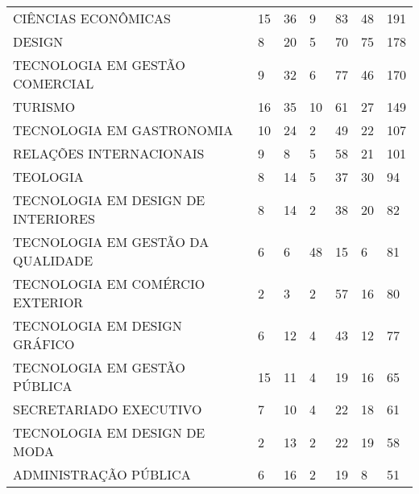 \begin{table}[H]
{\begin{tabular}{@{}lllllll@{}}
CIÊNCIAS ECONÔMICAS                      & 15                    & 36                & 9              & 83               & 48           & 191            \\
DESIGN                                   & 8                     & 20                & 5              & 70               & 75           & 178            \\
TECNOLOGIA EM GESTÃO COMERCIAL           & 9                     & 32                & 6              & 77               & 46           & 170            \\
TURISMO                                  & 16                    & 35                & 10             & 61               & 27           & 149            \\
TECNOLOGIA EM GASTRONOMIA                & 10                    & 24                & 2              & 49               & 22           & 107            \\
RELAÇÕES INTERNACIONAIS                  & 9                     & 8                 & 5              & 58               & 21           & 101            \\
TEOLOGIA                                 & 8                     & 14                & 5              & 37               & 30           & 94             \\
TECNOLOGIA EM DESIGN DE INTERIORES       & 8                     & 14                & 2              & 38               & 20           & 82             \\
TECNOLOGIA EM GESTÃO DA QUALIDADE        & 6                     & 6                 & 48             & 15               & 6            & 81             \\
TECNOLOGIA EM COMÉRCIO EXTERIOR          & 2                     & 3                 & 2              & 57               & 16           & 80             \\
TECNOLOGIA EM DESIGN GRÁFICO             & 6                     & 12                & 4              & 43               & 12           & 77             \\
TECNOLOGIA EM GESTÃO PÚBLICA             & 15                    & 11                & 4              & 19               & 16           & 65             \\
SECRETARIADO EXECUTIVO                   & 7                     & 10                & 4              & 22               & 18           & 61             \\
TECNOLOGIA EM DESIGN DE MODA             & 2                     & 13                & 2              & 22               & 19           & 58             \\
ADMINISTRAÇÃO PÚBLICA                    & 6                     & 16                & 2              & 19               & 8            & 51             \\ \bottomrule
\end{tabular}%
}
\end{table}